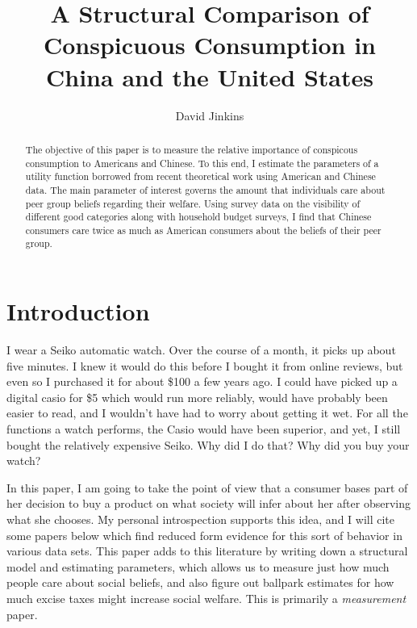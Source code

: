 \documentclass[12pt]{article}
\title{A Structural Comparison of Conspicuous Consumption in China and the United States
}
\author{David Jinkins}
\begin{document}
\maketitle

\begin{abstract}
    The objective of this paper is to measure the relative importance of conspicous consumption to Americans and Chinese.  To this end, I estimate the parameters of a utility function borrowed from recent theoretical work using American and Chinese data.  The main parameter of interest governs the amount that individuals care about peer group beliefs regarding their welfare.  Using survey data on the visibility of different good categories along with household budget surveys, I find that Chinese consumers care twice as much as American consumers about the beliefs of their peer group.  
\end{abstract}

\section{Introduction}

I wear a Seiko automatic watch.  Over the course of a month, it picks up about five minutes.  I knew it would do this before I bought it from online reviews, but even so I purchased it for about \$100 a few years ago.  I could have picked up a digital casio for \$5 which would run more reliably, would have probably been easier to read, and I wouldn't have had to worry about getting it wet.  For all the functions a watch performs, the Casio would have been superior, and yet, I still bought the relatively expensive Seiko.  Why did I do that?  Why did you buy your watch?

In this paper, I am going to take the point of view that a consumer bases part of her decision to buy a product on what society will infer about her after observing what she chooses.  
My personal introspection supports this idea, and I will cite some papers below which find reduced form evidence for this sort of behavior in various data sets. This paper adds to this literature by writing down a structural model and estimating parameters, which allows us to measure just how much people care about social beliefs, and also figure out ballpark estimates for how much excise taxes might increase social welfare. This is primarily a \emph{measurement} paper.
\end{document}
